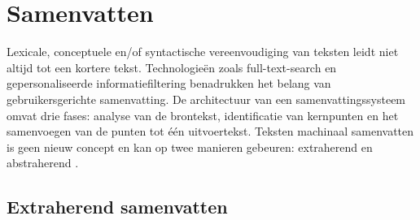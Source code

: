 \section{Samenvatten}

Lexicale, conceptuele en/of syntactische vereenvoudiging van teksten leidt niet altijd tot een kortere tekst. Technologieën zoals full-text-search en gepersonaliseerde informatiefiltering benadrukken het belang van gebruikersgerichte samenvatting. De architectuur van een samenvattingssysteem omvat drie fases: analyse van de brontekst, identificatie van kernpunten en het samenvoegen van de punten tot één uitvoertekst. Teksten machinaal samenvatten is geen nieuw concept en kan op twee manieren gebeuren: extraherend en abstraherend \autocite{Hahn2000, Dubay2004}.



\subsection{Extraherend samenvatten}

